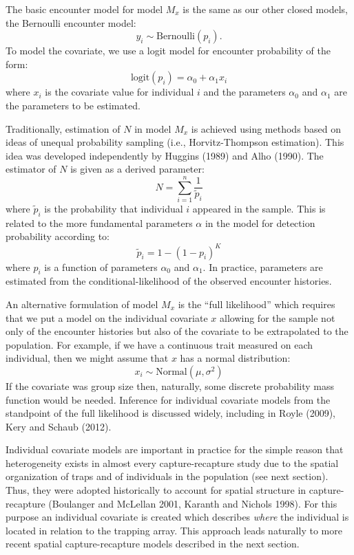 \documentclass{book}
\begin{document}
The basic encounter model for model $M_x$ is the same as our other
closed models, the Bernoulli encounter model:
\[
y_{i} \sim \mbox{Bernoulli}(p_{i}).
\]
To model the covariate, we use a logit model for encounter probability
of the form:
\begin{equation}
 \mbox{logit}(p_{i}) = \alpha_0 + \alpha_1 x_{i}
\end{equation}
where $x_i$ is the covariate value for individual $i$ and the
parameters $\alpha_0$ and $\alpha_1$ are the parameters to be
estimated.

Traditionally, estimation of $N$ in model $M_{x}$ is achieved using
methods based on ideas of unequal probability sampling (i.e.,
Horvitz-Thompson estimation). This idea was developed independently by
Huggins (1989) and Alho (1990). The estimator of $N$ is given as a
derived parameter:
\[
\hat{N} = \sum_{i=1}^{n} \frac{1}{\tilde{p}_{i}}
\]
where $\tilde{p}_{i}$ is the probability that individual $i$ appeared
in the sample.  This is related to the more fundamental parameters
$\alpha$ in the model for detection probability according to:
\[
\tilde{p}_{i}  = 1- (1-p_{i})^K
\]
where $p_{i}$ is a function of parameters $\alpha_{0}$ and
$\alpha_{1}$.  In practice, parameters are estimated from the
conditional-likelihood of the observed encounter histories.

An alternative formulation of model $M_x$ is the ``full likelihood''
which requires that we put a model on the individual covariate $x$
allowing for the sample not only of the encounter histories but also
of the covariate to be extrapolated to the population.  For example,
if we have a continuous trait measured on each individual, then we
might assume that $x$ has a normal distribution:
\[
x_{i} \sim \mbox{Normal}(\mu,\sigma^{2})
\]
If the covariate was group size then, naturally, some discrete
probability mass function would be needed. Inference for individual
covariate models from the standpoint of the  full likelihood is
discussed widely, including in Royle (2009), Kery and Schaub (2012).

Individual covariate models are important in practice for the simple
reason that heterogeneity exists in almost every capture-recapture
study due to the spatial organization of traps and of individuals in
the population (see next section). Thus, they were adopted historically
to account for spatial structure in capture-recapture (Boulanger and
McLellan 2001, Karanth and Nichols 1998).  For this purpose an
individual covariate is created which describes {\it where} the
individual is located in relation to the trapping array.  This
approach leads naturally to more recent spatial capture-recapture
models described in the next section.
\end{document}
